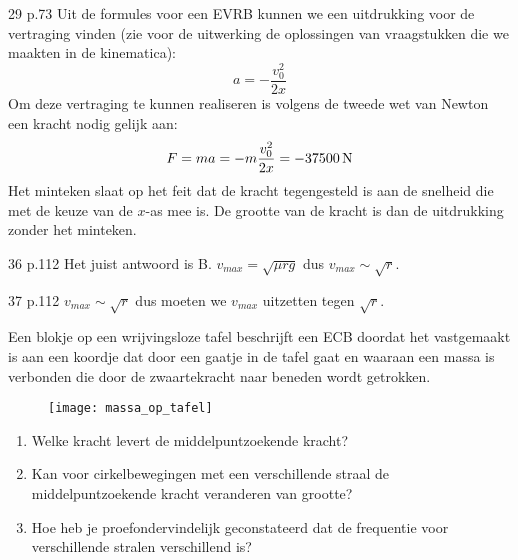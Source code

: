 \begin{exercise}
\begin{oplossing}
\item[29 p.73]Uit de formules voor een EVRB kunnen we een uitdrukking voor de vertraging vinden (zie voor de uitwerking de oplossingen van vraagstukken die we maakten in de kinematica):
\[
a=-\frac{v_0^2}{2x}
\]
Om deze vertraging te kunnen realiseren is volgens de tweede wet van Newton een kracht nodig gelijk aan:
\begin{eqnarray*}
F=ma=-m\frac{v_0^2}{2x}=-37500\rm\,N
\end{eqnarray*}
Het minteken slaat op het feit dat de kracht tegengesteld is aan de snelheid die met de keuze van de $x$-as mee is. De grootte van de kracht is dan de uitdrukking zonder het minteken.
\end{oplossing}

\begin{oplossing}
\item [36 p.112]
Het juist antwoord is B. $v_{max}=\sqrt{\mu rg}$ dus $v_{max}\sim\sqrt{r}$.

\item [37 p.112]
$v_{max}\sim\sqrt{r}$ dus moeten we $v_{max}$ uitzetten tegen
$\sqrt{r}$.
\end{oplossing}



\end{exercise}

\begin{exercise} Een blokje op een wrijvingsloze tafel beschrijft een ECB doordat het vastgemaakt is aan een koordje dat door een
gaatje in de tafel gaat en waaraan een massa is verbonden die door
de zwaartekracht naar beneden wordt getrokken.
\begin{figure}[h]
\begin{center}
\texttt{[image: massa\_op\_tafel]}
\end{center}
\end{figure}
\begin{enumerate}
\item Welke kracht levert de middelpuntzoekende kracht?
\item Kan voor cirkelbewegingen met een verschillende straal de
middelpuntzoekende kracht veranderen van grootte?
\item Hoe heb je proefondervindelijk geconstateerd dat de frequentie
voor verschillende stralen verschillend is?
\end{enumerate}

\end{exercise}

